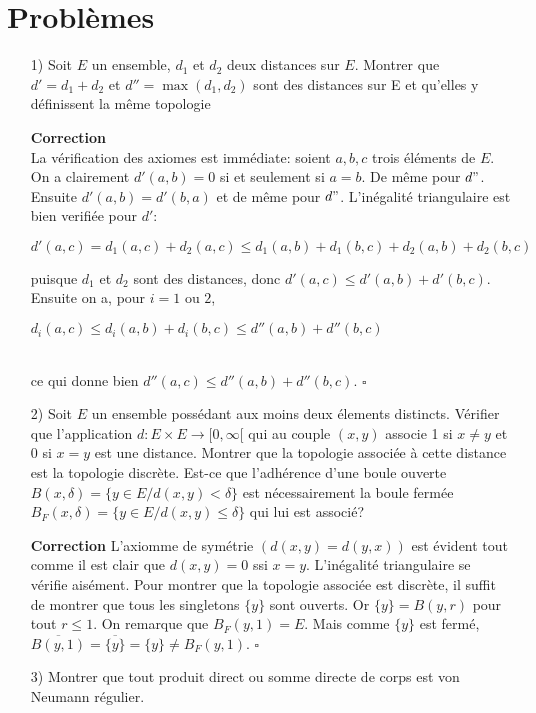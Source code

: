 \documentclass{article}
\begin{document}
\section*{Problèmes}
\begin{itemize}
    \item [1)]
Soit $E$ un ensemble, $d_1$ et $d_2$ deux distances sur $E$. Montrer que $d'=d_1+d_2$ et $d''=\max(d_1,d_2)$ sont des distances sur E et qu'elles y définissent la même topologie

\noindent\textbf{Correction}
\\ La vérification des axiomes est immédiate: soient $a,b,c$ trois éléments de $E$. On a clairement $d'(a,b)=0$ si et seulement si $a=b$. De même pour $d"$. Ensuite $d'(a,b)=d'(b,a)$ et de même pour $d"$. L'inégalité triangulaire est bien verifiée pour $d'$: \\
\begin{center}
   $d'(a,c)=d_1(a,c)+d_2(a,c)\leq d_1(a,b)+d_1(b,c)+d_2(a,b)+d_2(b,c)$
\end{center}puisque $d_1$ et $d_2$ sont des distances, donc $d'(a,c)\leq d'(a,b)+d'(b,c)$. Ensuite on a, pour $i=1$ ou $2$,\\
    \begin{center}
        $d_i(a,c)\leq d_i(a,b)+d_i(b,c)\leq d''(a,b)+d''(b,c)$ 
    \end{center} \\
ce qui donne bien $d''(a,c)\leq d''(a,b)+d''(b,c)$. \hfill $\square$
\item[2)] Soit $E$ un ensemble possédant aux moins deux élements distincts. Vérifier  que l'application $d: E\times E \rightarrow [0, \infty[$ qui au couple $(x,y)$ associe 1 si $x \neq y$ et 0 si $x=y$ est une distance. Montrer que la topologie associée à cette distance est la topologie discrète. Est-ce que l'adhérence d'une boule ouverte $B(x,\delta)=\{y \in E / d(x,y)<\delta\}$ est nécessairement la boule fermée $B_F(x, \delta)=\{y \in E /d(x,y)\leq \delta\}$ qui lui est associé?

\textbf{Correction}
L'axiomme de symétrie $(d(x,y)=d(y,x))$ est évident tout comme il est clair que $d(x,y)=0$ ssi $x=y$. L'inégalité triangulaire se vérifie aisément. Pour montrer que la topologie associée est discrète, il suffit de montrer que tous les singletons $\{y\}$ sont ouverts. Or $\{y\}=B(y,r)$ pour tout $r \leq 1$. On remarque que $B_F(y,1)=E$. Mais comme $\{y\}$ est fermé, $\overline{B(y,1)}= \overline {\{y\}}=\{y\} \neq B_F(y,1)$. \hfill $\square$
\item[3)]  Montrer que tout produit direct ou somme directe de corps est von Neumann régulier.


\end{itemize}
\end{document}

